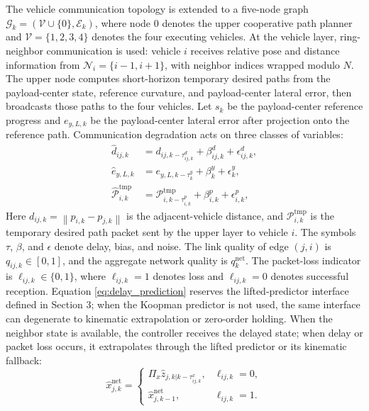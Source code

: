 \documentclass[letterpaper,journal]{IEEEtran}
\newcommand{\norm}[1]{\left\lVert #1 \right\rVert}
\begin{document}
The vehicle communication topology is extended to a five-node graph $\mathcal G_k=(\mathcal V\cup\{0\},\mathcal E_k)$, where node $0$ denotes the upper cooperative path planner and $\mathcal V=\{1,2,3,4\}$ denotes the four executing vehicles. At the vehicle layer, ring-neighbor communication is used: vehicle $i$ receives relative pose and distance information from $\mathcal N_i=\{i-1,i+1\}$, with neighbor indices wrapped modulo $N$. The upper node computes short-horizon temporary desired paths from the payload-center state, reference curvature, and payload-center lateral error, then broadcasts those paths to the four vehicles. Let $s_k$ be the payload-center reference progress and $e_{y,L,k}$ be the payload-center lateral error after projection onto the reference path. Communication degradation acts on three classes of variables:
\begin{equation}
\begin{aligned}
\hat d_{ij,k}&=d_{ij,k-\tau^d_{ij,k}}+\beta^d_{ij,k}+\epsilon^d_{ij,k},\\
\hat e_{y,L,k}&=e_{y,L,k-\tau^y_k}+\beta^y_k+\epsilon^y_k,\\
\hat{\mathcal P}_{i,k}^{\mathrm{tmp}}&=\mathcal P_{i,k-\tau^p_{i,k}}^{\mathrm{tmp}}+\beta^p_{i,k}+\epsilon^p_{i,k},
\end{aligned}
\label{eq:comm_corrupted_measurements}
\end{equation}
Here $d_{ij,k}=\norm{p_{i,k}-p_{j,k}}$ is the adjacent-vehicle distance, and $\mathcal P_{i,k}^{\mathrm{tmp}}$ is the temporary desired path packet sent by the upper layer to vehicle $i$. The symbols $\tau$, $\beta$, and $\epsilon$ denote delay, bias, and noise. The link quality of edge $(j,i)$ is $q_{ij,k}\in[0,1]$, and the aggregate network quality is $q_k^{\mathrm{net}}$. The packet-loss indicator is $\ell_{ij,k}\in\{0,1\}$, where $\ell_{ij,k}=1$ denotes loss and $\ell_{ij,k}=0$ denotes successful reception. Equation \eqref{eq:delay_prediction} reserves the lifted-predictor interface defined in Section 3; when the Koopman predictor is not used, the same interface can degenerate to kinematic extrapolation or zero-order holding. When the neighbor state is available, the controller receives the delayed state; when delay or packet loss occurs, it extrapolates through the lifted predictor or its kinematic fallback:
\begin{equation}
\hat x_{j,k}^{\mathrm{net}}=
\begin{cases}
\Pi_x \hat z_{j,k|k-\tau^x_{ij,k}}, & \ell_{ij,k}=0,\\
\hat x_{j,k-1}^{\mathrm{net}}, & \ell_{ij,k}=1 .
\end{cases}
\label{eq:delay_prediction}
\end{equation}
\end{document}
